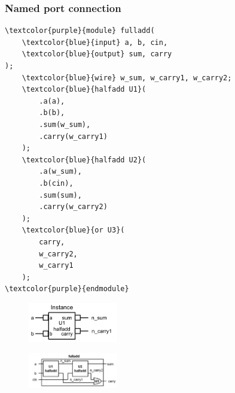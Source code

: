 \documentclass[t, notes]{beamer}
\begin{document}
\begin{frame}[fragile]
\frametitle{Named port connection}
\begin{multicols}{2}
{\scriptsize%
\begin{Verbatim}[commandchars=\\\{\}, tabsize=2]
\textcolor{purple}{module} fulladd(
    \textcolor{blue}{input} a, b, cin,
    \textcolor{blue}{output} sum, carry
);
    \textcolor{blue}{wire} w_sum, w_carry1, w_carry2;
    \textcolor{blue}{halfadd U1}(
        .a(a),
        .b(b),
        .sum(w_sum),
        .carry(w_carry1)
    );
    \textcolor{blue}{halfadd U2}(
        .a(w_sum),
        .b(cin),
        .sum(sum),
        .carry(w_carry2)
    );
    \textcolor{blue}{or U3}(
        carry, 
        w_carry2,
        w_carry1
    );
\textcolor{purple}{endmodule}
\end{Verbatim}
}
\columnbreak
\begin{figure}[H!]
	\includegraphics[width=0.35\textwidth]{img/03_inst.png}
\end{figure}
\begin{figure}[H!]
    \includegraphics[width=0.35\textwidth]{img/03_fulladd.png}
\end{figure}
\end{multicols}
\end{frame}
\end{document}
